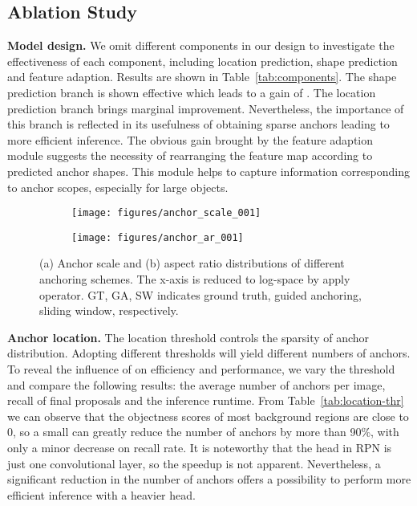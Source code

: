 \documentclass[10pt,twocolumn,letterpaper]{article}
\begin{document}
\subsection{Ablation Study}

\noindent
\textbf{Model design.}
We omit different components in our design to investigate the effectiveness
of each component, including location prediction, shape prediction and
feature adaption.
Results are shown in Table~\ref{tab:components}. The shape prediction branch
is shown effective which leads to a gain of .
The location prediction branch brings marginal improvement. Nevertheless, the importance of this branch is reflected in its usefulness of obtaining sparse anchors leading to more efficient inference.
The obvious gain brought by the feature adaption module suggests the necessity
of rearranging the feature map according to predicted anchor shapes.
This module helps to capture information corresponding to anchor scopes,
especially for large objects.

\begin{figure}[tb]
	\centering
	\begin{subfigure}{.23\textwidth}
		\centering
		\texttt{[image: figures/anchor\_scale\_001]}
		\caption{}
		\label{subfig:anchor-scale}
	\end{subfigure}
	\vspace{-0.2cm}
	\begin{subfigure}{.23\textwidth}
		\centering
		\texttt{[image: figures/anchor\_ar\_001]}
		\caption{}
		\label{subfig:anchor-ar}
	\end{subfigure}
	\vspace{-0.2cm}
	\caption{\small{(a) Anchor scale and (b) aspect ratio distributions of different anchoring schemes.
		The x-axis is reduced to log-space by apply  operator. GT, GA, SW indicates ground truth, guided anchoring, sliding window, respectively.}}
	\label{fig:anchor-dist}
	\vspace{-0.6cm}
\end{figure}

\noindent
\textbf{Anchor location.}
The location threshold  controls the sparsity of anchor distribution.
Adopting different thresholds will yield different numbers of anchors.
To reveal the influence of  on efficiency and performance,
we vary the threshold and compare the following results: the average number
of anchors per image, recall of final proposals and the inference runtime.
From Table~\ref{tab:location-thr} we can observe that the objectness scores of
most background regions are close to 0, so a small  can
greatly reduce the number of anchors by more than 90\%, with only a minor
decrease on recall rate.
It is noteworthy that the head in RPN is just one convolutional layer,
so the speedup is not apparent. Nevertheless, a significant reduction in the number of anchors offers a possibility to perform more efficient inference with a heavier head.
\end{document}
